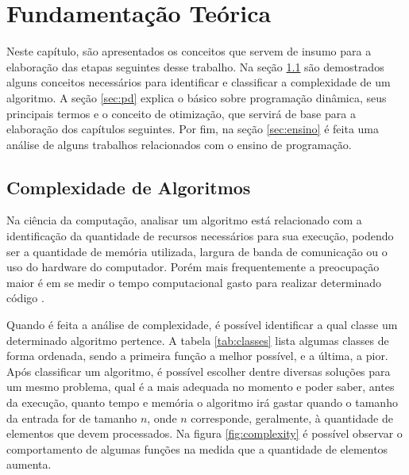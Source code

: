 
\chapter{Fundamentação Teórica}
\label{chap:fundamentacao}

Neste capítulo, são apresentados os conceitos que servem de insumo para a elaboração das etapas seguintes desse trabalho. Na seção \ref{sec:complexidade} são demostrados alguns conceitos necessários para identificar e classificar a complexidade de um algoritmo. A seção \ref{sec:pd} explica o básico sobre programação dinâmica, seus principais termos e o conceito de otimização, que servirá de base para a elaboração dos capítulos seguintes. Por fim, na seção \ref{sec:ensino} é feita uma análise de alguns trabalhos relacionados com o ensino de programação.



\section{Complexidade de Algoritmos}
\label{sec:complexidade}
Na ciência da computação, analisar um algoritmo está relacionado com a identificação da quantidade de recursos necessários para sua execução, podendo ser a quantidade de memória utilizada, largura de banda de comunicação ou o uso do hardware do computador. Porém mais frequentemente a preocupação maior é em se medir o tempo computacional gasto para realizar determinado código \cite{Cormen09a}.

Quando é feita a análise de complexidade, é possível identificar a qual classe um determinado algoritmo pertence. A tabela \ref{tab:classes} lista algumas classes de forma ordenada, sendo a primeira função a melhor possível, e a última, a pior. Após classificar um algoritmo, é possível escolher dentre diversas soluções para um mesmo problema, qual é a mais adequada no momento e poder saber, antes da execução, quanto tempo e memória o algoritmo irá gastar quando o tamanho da entrada for de tamanho $n$, onde $n$ corresponde, geralmente, à quantidade de elementos que devem processados. Na figura \ref{fig:complexity} é possível observar o comportamento de algumas funções na medida que a quantidade de elementos aumenta.


